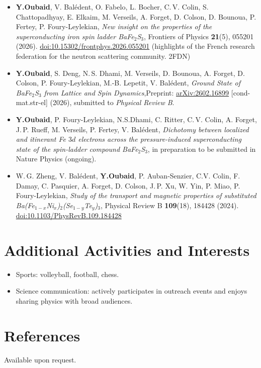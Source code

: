 \documentclass[13pt,a4paper]{article}
\newcommand{\sectitle}[1]{\textcolor{sectiontitlecolor}{#1}}
\begin{document}
\begin{itemize}

  \item \textbf{Y.Oubaid}, V. Bal\'edent, O. Fabelo, L. Bocher, C.\,V. Colin, S. Chattopadhyay, E. Elkaim, M. Verseils, A. Forget, D. Colson, D. Bounoua, P. Fertey, P. Foury-Leylekian, \emph{New insight on the properties of the superconducting iron spin ladder BaFe$_2$S$_3$}, Frontiers of Physics \textbf{21}(5), 055201 (2026). \href{https://doi.org/10.15302/frontphys.2026.055201}{doi:10.15302/frontphys.2026.055201} (highlights of the French research federation for the neutron scattering community. 2FDN)

  \item \textbf{Y.Oubaid}, S. Deng, N.\,S. Dhami, M. Verseils, D. Bounoua, A. Forget, D. Colson, P. Foury-Leylekian, M.-B. Lepetit, V. Bal\'edent, \emph{Ground State of BaFe$_2$S$_3$ from Lattice and Spin Dynamics},Preprint: \href{https://arxiv.org/abs/2602.16899}{arXiv:2602.16899} [cond-mat.str-el] (2026), submitted to \emph{Physical Review B}.

  \item \textbf{Y.Oubaid}, P. Foury-Leylekian, N.S.Dhami, C. Ritter, C.\,V. Colin, A. Forget, J.\,P. Rueff, M. Verseils, P. Fertey, V. Bal\'edent, \emph{Dichotomy between localized and itinerant Fe $3d$ electrons across the pressure-induced superconducting state of the spin-ladder compound BaFe$_2$S$_3$}, in preparation to be submitted in Nature Physics (ongoing).
  
  \item W.\,G. Zheng, V. Bal\'edent, \textbf{Y.Oubaid}, P. Auban-Senzier, C.V. Colin, F. Damay, C. Pasquier, A. Forget, D. Colson, J.\,P. Xu, W. Yin, P. Miao, P. Foury-Leylekian, \emph{Study of the transport and magnetic properties of substituted Ba(Fe$_{1-x}$Ni$_x$)$_2$(Se$_{1-y}$Te$_y$)$_3$}, Physical Review B \textbf{109}(18), 184428 (2024). \href{https://doi.org/10.1103/PhysRevB.109.184428}{doi:10.1103/PhysRevB.109.184428}


\end{itemize}


\section*{\sectitle{Additional Activities and Interests}}
\begin{itemize}
  \item Sports: volleyball, football, chess.
  \item Science communication: actively participates in outreach events and enjoys sharing physics with broad audiences.
\end{itemize}

\section*{\sectitle{References}}
Available upon request.
\end{document}
